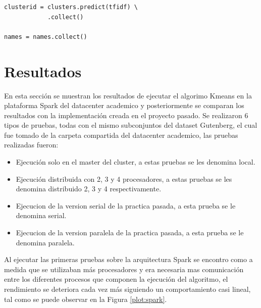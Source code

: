 \documentclass[conference,compsoc]{IEEEtran}
\begin{document}
\vspace{0.5cm}

\begin{lstlisting}
clusterid = clusters.predict(tfidf) \
			.collect()
	
names = names.collect()
\end{lstlisting}

\vspace{0.5cm}

\section{Resultados}

En esta sección se muestran los resultados de ejecutar el algorimo Kmeans en la
plataforma Spark del datacenter academico y posteriormente se comparan los
resultados con la implementación creada en el proyecto pasado. Se realizaron 6 tipos
de pruebas, todas con el mismo subconjuntos del dataset Gutenberg, el cual fue
tomado de la carpeta compartida del datacenter academico, las pruebas realizadas
fueron:\\

\begin{itemize}
    \item Ejecución solo en el master del cluster, a estas pruebas se les denomina local.
    \item Ejecución distribuida con 2, 3 y 4 procesadores, a estas pruebas se les denomina
          distribuido 2, 3 y 4 respectivamente.
    \item Ejecucion de la version serial de la practica pasada, a esta prueba se le
          denomina serial.
    \item Ejecucion de la version paralela de la practica pasada, a esta prueba se le
          denomina paralela.
\end{itemize}

Al ejecutar las primeras pruebas sobre la arquitectura Spark se encontro como
a medida que se utilizaban más procesadores y era necesaria mas comunicación entre
los diferentes procesos que componen la ejecución del algoritmo, el rendimiento se
deteriora cada vez más siguiendo un comportamiento casi lineal, tal como se puede
observar en la Figura \ref{plot:spark}.
\end{document}
